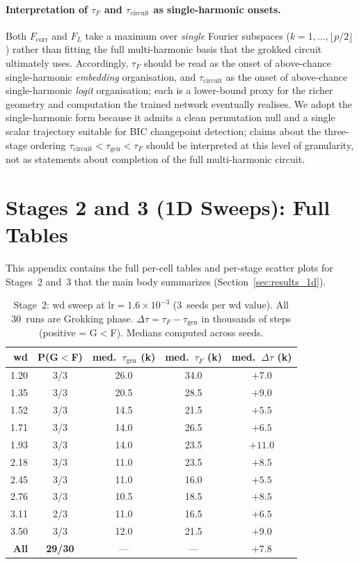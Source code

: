 \documentclass{article}
\newcommand{\taug}{\tau_{\mathrm{gen}}}
\newcommand{\tauf}{\tau_{F}}
\newcommand{\taucirc}{\tau_{\mathrm{circuit}}}
\newcommand{\Dtau}{\Delta\tau}
\newcommand{\fcorr}{F_{\mathrm{corr}}}
\newcommand{\flogit}{F_{L}}
\begin{document}
\paragraph{Interpretation of $\tauf$ and $\taucirc$ as single-harmonic
onsets.}
Both $\fcorr$ and $\flogit$ take a maximum over \emph{single} Fourier
subspaces ($k=1,\dots,\lfloor p/2\rfloor$) rather than fitting the
full multi-harmonic basis that the grokked circuit ultimately uses.
Accordingly, $\tauf$ should be read as the onset of above-chance
single-harmonic \emph{embedding} organisation, and $\taucirc$ as the
onset of above-chance single-harmonic \emph{logit} organisation; each
is a lower-bound proxy for the richer geometry and computation the
trained network eventually realises.
We adopt the single-harmonic form because it admits a clean
permutation null and a single scalar trajectory suitable for BIC
changepoint detection; claims about the three-stage ordering
$\taucirc<\taug<\tauf$ should be interpreted at this level of
granularity, not as statements about completion of the full
multi-harmonic circuit.



\section{Stages 2 and 3 (1D Sweeps): Full Tables}
\label{app:results_1d_extended}

This appendix contains the full per-cell tables and per-stage
scatter plots for Stages~2 and~3 that the main body summarizes
(Section~\ref{sec:results_1d}).

\begin{table}[t]
  \centering
  \caption{Stage~2: wd sweep at $\mathrm{lr}=1.6\times10^{-3}$
    (3~seeds per wd value). All 30~runs are Grokking phase.
    $\Dtau{=}\tauf{-}\taug$ in thousands of steps (positive = G$<$F).
    Medians computed across seeds.}
  \label{tab:stage2}
  \small
  \begin{tabular}{rcccc}
    \toprule
    wd & P(G$<$F) & med.\ $\taug$ (k) & med.\ $\tauf$ (k) & med.\ $\Dtau$ (k) \\
    \midrule
    1.20 & 3/3 & 26.0 & 34.0 & $+7.0$ \\
    1.35 & 3/3 & 20.5 & 28.5 & $+9.0$ \\
    1.52 & 3/3 & 14.5 & 21.5 & $+5.5$ \\
    1.71 & 3/3 & 14.0 & 26.5 & $+6.5$ \\
    1.93 & 3/3 & 14.0 & 23.5 & $+11.0$ \\
    2.18 & 3/3 & 11.0 & 23.5 & $+8.5$ \\
    2.45 & 3/3 & 11.0 & 16.0 & $+5.5$ \\
    2.76 & 3/3 & 10.5 & 18.5 & $+8.5$ \\
    3.11 & 2/3 & 11.0 & 16.5 & $+6.5$ \\
    3.50 & 3/3 & 12.0 & 21.5 & $+9.0$ \\
    \midrule
    \textbf{All} & \textbf{29/30} & --- & --- & $+7.8$ \\
    \bottomrule
  \end{tabular}
\end{table}
\end{document}
